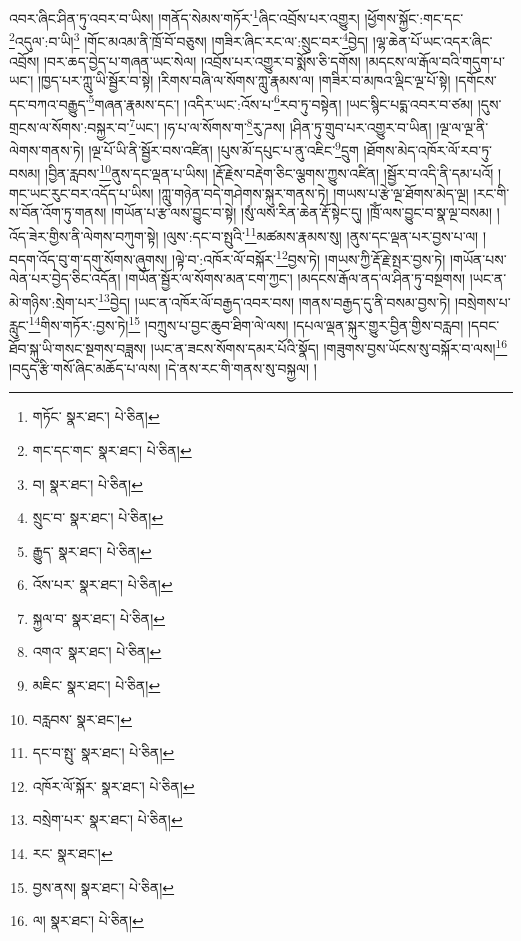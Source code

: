 འབར་ཞིང་ཤིན་ཏུ་འབར་བ་ཡིས། །གནོད་སེམས་གཏོར་\footnote{གཏོང་  སྣར་ཐང་།  པེ་ཅིན། }ཞིང་འབྲོས་པར་འགྱུར། །ཕྱོགས་སྐྱོང་:གང་དང་\footnote{གང་དང་གང་  སྣར་ཐང་།  པེ་ཅིན། }འདུལ་:བ་ཡི།\footnote{བ།  སྣར་ཐང་།  པེ་ཅིན། } །གོང་མའམ་ནི་ཁྲོ་བོ་བཅུས། །གཟིར་ཞིང་རང་ལ་:སྲུང་བར་\footnote{སྲུང་བ་  སྣར་ཐང་།  པེ་ཅིན། }བྱེད། །ལྷ་ཆེན་པོ་ཡང་འདར་ཞིང་འབྲོས། །བར་ཆད་བྱེད་པ་གཞན་ཡང་སེལ། །འབྲོས་པར་འགྱུར་བ་སྨོས་ཅི་དགོས། །མདངས་ལ་རྒོལ་བའི་གདུག་པ་ཡང་། །ཁྱད་པར་ཀླུ་ཡི་སྦྱོར་བ་སྟེ། །རིགས་བཞི་ལ་སོགས་ཀླུ་རྣམས་ལ། །གཟིར་བ་མཁའ་ལྡིང་ལྔ་པོ་སྟེ། །དགོངས་དང་བཀའ་བརྒྱུད་\footnote{རྒྱུད་  སྣར་ཐང་།  པེ་ཅིན། }གཞན་རྣམས་དང་། །འདིར་ཡང་:འོས་པ་\footnote{འོས་པར་  སྣར་ཐང་།  པེ་ཅིན། }རབ་ཏུ་བསྟེན། །ཡང་སྙིང་པདྨ་འབར་བ་ཙམ། །དུས་གྲངས་ལ་སོགས་:བསྐྱར་བ་\footnote{སྐྱལ་བ་  སྣར་ཐང་།  པེ་ཅིན། }ཡང་། །ཧ་པ་ལ་སོགས་ག་\footnote{འགའ་  སྣར་ཐང་།  པེ་ཅིན། }རུ་ཌས། །ཤིན་ཏུ་གྲུབ་པར་འགྱུར་བ་ཡིན། །ལྔ་ལ་ལྔ་ནི་ལེགས་གནས་ཏེ། །ལྔ་པོ་ཡི་ནི་སྦྱོར་བས་འཛིན། །པུས་མོ་དཔུང་པ་ནུ་འཇིང་\footnote{མཇིང་  སྣར་ཐང་།  པེ་ཅིན། }དྲུག །ཐོགས་མེད་འཁོར་ལོ་རབ་ཏུ་བསམ། །བྱིན་རླབས་\footnote{བརླབས་  སྣར་ཐང་། }ནུས་དང་ལྡན་པ་ཡིས། །རྡོ་རྗེས་བརྡེག་ཅིང་ལྕགས་ཀྱུས་འཛིན། །སྦྱོར་བ་འདི་ནི་དམ་པའོ། །གང་ཡང་རུང་བར་འདོད་པ་ཡིས། །ཀླུ་གཉེན་བདེ་གཤེགས་སྐུར་གནས་ཏེ། །གཡས་པ་རྩེ་ལྔ་ཐོགས་མེད་ལྔ། །རང་གི་ས་བོན་འོག་ཏུ་གནས། །གཡོན་པ་རྩ་ལས་བྱུང་བ་སྟེ། །སུཾ་ལས་རིན་ཆེན་རྡོ་སྟེང་དུ། །ཁྲོཾ་ལས་བྱུང་བ་སྣ་ལྔ་བསམ། །འོད་ཟེར་གྱིས་ནི་ལེགས་བཀུག་སྟེ། །ལུས་:དང་བ་སྤུའི་\footnote{དང་བ་སྤུ་  སྣར་ཐང་།  པེ་ཅིན། }མཚམས་རྣམས་སུ། །ནུས་དང་ལྡན་པར་བྱས་པ་ལ། །བདག་འོད་བུ་ག་དགུ་སོགས་ཞུགས། །ལྟེ་བ་:འཁོར་ལོ་བསྐོར་\footnote{འཁོར་ལོ་སྐོར་  སྣར་ཐང་།  པེ་ཅིན། }བྱས་ཏེ། །གཡས་ཀྱི་རྡོ་རྗེ་སྤར་བྱས་ཏེ། །གཡོན་པས་ལེན་པར་བྱེད་ཅིང་འདོན། །གཡོན་སྦྱོར་ལ་སོགས་མན་ངག་ཀྱང་། །མདངས་རྒོལ་ནད་ལ་ཤིན་ཏུ་བསྔགས། །ཡང་ན་མེ་གཉིས་:སྲེག་པར་\footnote{བསྲེག་པར་  སྣར་ཐང་།  པེ་ཅིན། }བྱེད། །ཡང་ན་འཁོར་ལོ་བརྒྱད་འབར་བས། །གནས་བརྒྱད་དུ་ནི་བསམ་བྱས་ཏེ། །བསྲེགས་པ་རླུང་\footnote{རང་  སྣར་ཐང་། }གིས་གཏོར་:བྱས་ཏེ།\footnote{བྱས་ནས།  སྣར་ཐང་།  པེ་ཅིན། } །བཀྲུས་པ་བྱང་ཆུབ་ཐིག་ལེ་ལས། །དཔལ་ལྡན་སྐུར་གྱུར་བྱིན་གྱིས་བརླབ། །དབང་ཐོབ་སྐུ་ཡི་གསང་སྔགས་བཟླས། །ཡང་ན་ཟངས་སོགས་དམར་པོའི་སྣོད། །གཟུགས་བྱས་ཡོངས་སུ་བསྐོར་བ་ལས།\footnote{ལ།  སྣར་ཐང་།  པེ་ཅིན། } །བདུད་རྩི་གསོ་ཞིང་མཆོད་པ་ལས། །དེ་ནས་རང་གི་གནས་སུ་བསྐྱལ། །
